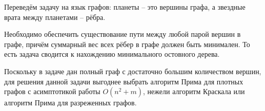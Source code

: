 \solutionSection

Переведём задачу на язык графов:
планеты -- это вершины графа,
а звездные врата между планетами -- рёбра.

Необходимо обеспечить существование пути между любой парой вершин в графе,
причём суммарный вес всех рёбер в графе должен быть минимален.
То есть задача сводится к нахождению минимального остовного дерева.

Поскольку в задаче дан полный граф с достаточно большим количеством вершин,
для решения данной задачи выгоднее выбрать алгоритм Прима для плотных графов
с асимптотикой работы $O(n^2 + m)$,
нежели алгоритм Краскала или алгоритм Прима для разреженных графов.

\codeExample

{}
